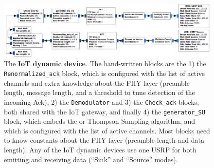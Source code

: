 \begin{figure}[!b]
	\centering
    \includegraphics[width=1.00\textwidth]{2-Chapters/4-Chapter/Images/USRP_TX_SU__v1__simple_grc.png}
    \caption{The \textbf{IoT dynamic device}. The hand-written blocks are the 1) the \texttt{Renormalized\_ack} block, which is configured with the list of active channels and extra knowledge about the PHY layer (preamble length, message length, and a threshold to tune detection of the incoming Ack), 2) the \texttt{Demodulator} and 3) the \texttt{Check\_ack} blocks, both shared with the IoT gateway, and finally 4) the \texttt{generator\_SU} block, which embeds the \UCB{} or Thompson Sampling algorithm, and which is configured with the list of active channels. Most blocks need to know constants about the PHY layer (preamble length and data length). Any of the IoT dynamic devices use one USRP for both emitting and receiving data (``Sink'' and ``Source'' modes).}
    \label{fig:4app:USRP_TX_SU__v1__simple_grc}
\end{figure}